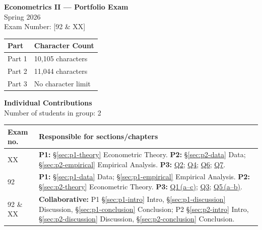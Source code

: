 \documentclass[12pt]{article}
\begin{document}
\begin{titlepage}
\centering
\vspace*{1.5cm}
{\LARGE\bfseries Econometrics II --- Portfolio Exam}\\[0.5cm]
{\Large Spring 2026}\\[1.5cm]
{\large Exam Number: [92 \& XX]}\\[1.5cm]
\begin{tabular}{ll}
\toprule
\textbf{Part} & \textbf{Character Count} \\
\midrule
Part 1 & 10,105 characters \\
Part 2 & 11,044 characters \\
Part 3 & No character limit \\
\bottomrule
\end{tabular}

\vspace{1.2cm}

{\large\bfseries Individual Contributions}\\[0.3cm]
{\small Number of students in group: 2}

\vspace{0.4cm}
\begin{small}
\begin{tabular}{@{}p{1.6cm} p{13cm}@{}}
\toprule
\textbf{Exam no.} & \textbf{Responsible for sections/chapters} \\
\midrule
XX &
\textbf{P1:} \S\ref{sec:p1-theory} Econometric Theory.\;
\textbf{P2:} \S\ref{sec:p2-data} Data; \S\ref{sec:p2-empirical} Empirical Analysis.\;
\textbf{P3:} \hyperref[sec:p3-q2]{Q2}; \hyperref[sec:p3-q4]{Q4}; \hyperref[sec:p3-q6]{Q6}; \hyperref[sec:p3-q7]{Q7}. \\[4pt]
92 &
\textbf{P1:} \S\ref{sec:p1-data} Data; \S\ref{sec:p1-empirical} Empirical Analysis.\;
\textbf{P2:} \S\ref{sec:p2-theory} Econometric Theory.\;
\textbf{P3:} \hyperref[sec:p3-q1]{Q1\,(a--c)}; \hyperref[sec:p3-q3]{Q3}; \hyperref[sec:p3-q5]{Q5\,(a--b)}. \\[4pt]

\midrule
92 \& XX &
\textbf{Collaborative:} P1 \S\ref{sec:p1-intro} Intro, \S\ref{sec:p1-discussion} Discussion, \S\ref{sec:p1-conclusion} Conclusion;\; P2 \S\ref{sec:p2-intro} Intro, \S\ref{sec:p2-discussion} Discussion, \S\ref{sec:p2-conclusion} Conclusion. \\
\bottomrule
\end{tabular}
\end{small}
\vfill
\end{titlepage}
\end{document}
